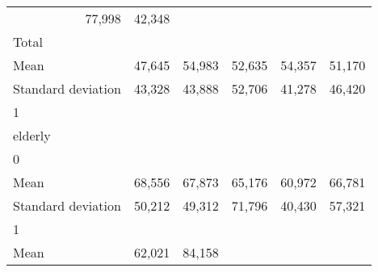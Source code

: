 \begin{tabular}{llllll}
  \multicolumn{1}{r}{77,998} &
  \multicolumn{1}{r}{42,348} \\
\multicolumn{1}{l}{\hspace{3em}Total} &
  \multicolumn{1}{|r}{} &
  \multicolumn{1}{r}{} &
  \multicolumn{1}{r}{} &
  \multicolumn{1}{r}{} &
  \multicolumn{1}{r}{} \\
\multicolumn{1}{l}{\hspace{4em}Mean} &
  \multicolumn{1}{|r}{47,645} &
  \multicolumn{1}{r}{54,983} &
  \multicolumn{1}{r}{52,635} &
  \multicolumn{1}{r}{54,357} &
  \multicolumn{1}{r}{51,170} \\
\multicolumn{1}{l}{\hspace{4em}Standard deviation} &
  \multicolumn{1}{|r}{43,328} &
  \multicolumn{1}{r}{43,888} &
  \multicolumn{1}{r}{52,706} &
  \multicolumn{1}{r}{41,278} &
  \multicolumn{1}{r}{46,420} \\
\multicolumn{1}{l}{\hspace{1em}1} &
  \multicolumn{1}{|r}{} &
  \multicolumn{1}{r}{} &
  \multicolumn{1}{r}{} &
  \multicolumn{1}{r}{} &
  \multicolumn{1}{r}{} \\
\multicolumn{1}{l}{\hspace{2em}elderly} &
  \multicolumn{1}{|r}{} &
  \multicolumn{1}{r}{} &
  \multicolumn{1}{r}{} &
  \multicolumn{1}{r}{} &
  \multicolumn{1}{r}{} \\
\multicolumn{1}{l}{\hspace{3em}0} &
  \multicolumn{1}{|r}{} &
  \multicolumn{1}{r}{} &
  \multicolumn{1}{r}{} &
  \multicolumn{1}{r}{} &
  \multicolumn{1}{r}{} \\
\multicolumn{1}{l}{\hspace{4em}Mean} &
  \multicolumn{1}{|r}{68,556} &
  \multicolumn{1}{r}{67,873} &
  \multicolumn{1}{r}{65,176} &
  \multicolumn{1}{r}{60,972} &
  \multicolumn{1}{r}{66,781} \\
\multicolumn{1}{l}{\hspace{4em}Standard deviation} &
  \multicolumn{1}{|r}{50,212} &
  \multicolumn{1}{r}{49,312} &
  \multicolumn{1}{r}{71,796} &
  \multicolumn{1}{r}{40,430} &
  \multicolumn{1}{r}{57,321} \\
\multicolumn{1}{l}{\hspace{3em}1} &
  \multicolumn{1}{|r}{} &
  \multicolumn{1}{r}{} &
  \multicolumn{1}{r}{} &
  \multicolumn{1}{r}{} &
  \multicolumn{1}{r}{} \\
\multicolumn{1}{l}{\hspace{4em}Mean} &
  \multicolumn{1}{|r}{62,021} &
  \multicolumn{1}{r}{84,158} &

\end{tabular}
